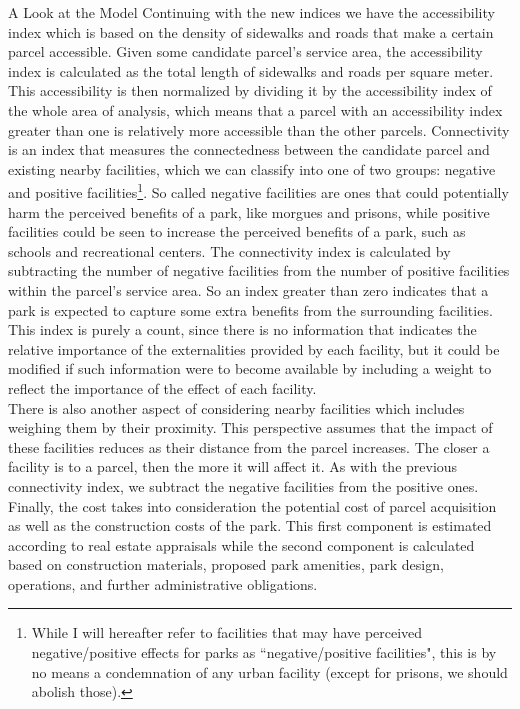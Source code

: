 \documentclass[12pt]{pom_thesis}
\theoremstyle{definition}
\begin{document}
\begin{chapter}{A Look at the Model}
Continuing with the new indices we have the accessibility index which is based on the density of sidewalks and roads that make a certain parcel accessible. Given some candidate parcel's service area, the accessibility index is calculated as the total length of sidewalks and roads per square meter. This accessibility is then normalized by dividing it by the accessibility index of the whole area of analysis, which means that a parcel with an accessibility index greater than one is relatively more accessible than the other parcels. Connectivity is an index that measures the connectedness between the candidate parcel and existing nearby facilities, which we can classify into one of two groups: negative and positive facilities\footnote{While I will hereafter refer to facilities that may have perceived negative/positive effects for parks as ``negative/positive facilities", this is by no means a condemnation of any urban facility (except for prisons, we should abolish those).}. So called negative facilities  are ones that could potentially harm the perceived benefits of a park, like morgues and prisons, while positive facilities could be seen to increase the perceived benefits of a park, such as schools and recreational centers. The connectivity index is calculated by subtracting the number of negative facilities from the number of positive facilities within the parcel's service area. So an index greater than zero indicates that a park is expected to capture some extra benefits from the surrounding facilities. This index is purely a count, since there is no information that indicates the relative importance of the externalities provided by each facility, but it could be modified if such information were to become available by including a weight to reflect the importance of the effect of each facility. \\

There is also another aspect of considering nearby facilities which includes weighing them by their proximity. This perspective assumes that the impact of these facilities reduces as their distance from the parcel increases. The closer a facility is to a parcel, then the more it will affect it. As with the previous connectivity index, we subtract the negative facilities from the positive ones. Finally, the cost takes into consideration the potential cost of parcel acquisition as well as the construction costs of the park. This first component is estimated according to real estate appraisals while the second component is calculated based on construction materials, proposed park amenities, park design, operations, and further administrative obligations. \\


\end{chapter}
\end{document}
